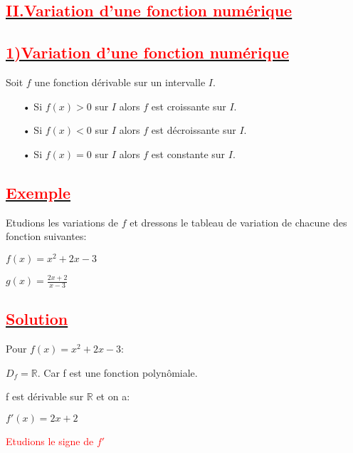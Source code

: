 \documentclass[12pt]{article}
\begin{document}
\subsection*{\underline{\textbf{\textcolor{red}{II.Variation d'une fonction numérique}}}}
\subsection*{\underline{\textbf{\textcolor{red}{1)Variation d'une fonction numérique}}}}
Soit $f$ une fonction dérivable sur un intervalle $I$.
\begin{enumerate}
\item[•] Si $f(x)>0$ sur $I$ alors $f$ est croissante sur $I$.
\item[•] Si $f(x)<0$ sur $I$ alors $f$ est décroissante sur $I$.
\item[•] Si $f(x)=0$ sur $I$ alors $f$ est constante sur $I$.
\end{enumerate}
\subsection*{\underline{\textbf{\textcolor{red}{Exemple}}}}
Etudions les variations de $f$ et dressons le tableau de variation de chacune des fonction suivantes:

$f(x)=x^{2}+2x-3$

$g(x)=\frac{2x+2}{x-3}$
\subsection*{\underline{\textbf{\textcolor{red}{Solution}}}}
Pour $f(x)=x^{2}+2x-3$:

$D_{f}=\mathbb{R}$. Car f est une fonction polynômiale.

f est dérivable sur $\mathbb{R}$ et on a:

$f'(x)=2x+2$

\textcolor{red}{Etudions le signe de $f'$}
\end{document}
